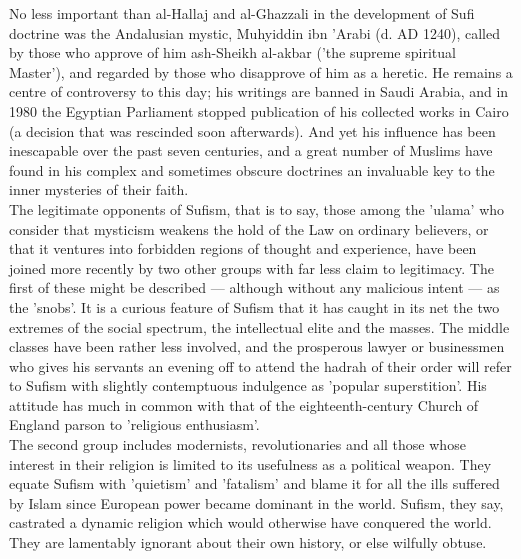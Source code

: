 \documentclass[10pt, twoside]{book}
\begin{document}
No less important than al\hyp{}Hallaj and al\hyp{}Ghazzali in the development of Sufi doctrine was the 
Andalusian mystic, Muhyiddin ibn 'Arabi (d. AD 1240), called by those who approve of him ash\hyp{}Sheikh 
al\hyp{}akbar ('the supreme spiritual Master'), and regarded by those who disapprove of him as a heretic. 
He remains a centre of controversy to this day; his writings are banned in Saudi Arabia, and in 1980 
the Egyptian Parliament stopped publication of his collected works in Cairo (a decision that was 
rescinded soon afterwards). And yet his influence has been inescapable over the past seven centuries, 
and a great number of Muslims have found in his complex and sometimes obscure doctrines an invaluable 
key to the inner mysteries of their faith. \\

The legitimate opponents of Sufism, that is to say, those among the 'ulama' who consider that 
mysticism weakens the hold of the Law on ordinary believers, or that it ventures into forbidden 
regions of thought and experience, have been joined more recently by two other groups with far less 
claim to legitimacy. The first of these might be described --- although without any malicious intent --- 
as the 'snobs'. It is a curious feature of Sufism that it has caught in its net the two extremes of 
the social spectrum, the intellectual elite and the masses. The middle classes have been rather less 
involved, and the prosperous lawyer or businessmen who gives his servants an evening off to attend 
the hadrah of their order will refer to Sufism with slightly contemptuous indulgence as 'popular 
superstition'. His attitude has much in common with that of the eighteenth\hyp{}century Church of England 
parson to 'religious enthusiasm'. \\

The second group includes modernists, revolutionaries and all those whose interest in their religion 
is limited to its usefulness as a political weapon. They equate Sufism with 'quietism' and 'fatalism' 
and blame it for all the ills suffered by Islam since European power became dominant in the world. 
Sufism, they say, castrated a dynamic religion which would otherwise have conquered the world. They 
are lamentably ignorant about their own history, or else wilfully obtuse. \\
\end{document}
